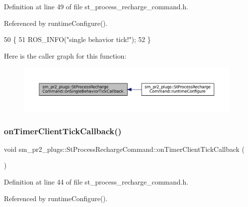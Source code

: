 Definition at line 49 of file st\+\_\+process\+\_\+recharge\+\_\+command.\+h.



Referenced by runtime\+Configure().


\begin{DoxyCode}
50     \{
51         ROS\_INFO(\textcolor{stringliteral}{"single behavior tick!"});
52     \}
\end{DoxyCode}
Here is the caller graph for this function\+:
\nopagebreak
\begin{figure}[H]
\begin{center}
\leavevmode
\includegraphics[width=350pt]{structsm__pr2__plugs_1_1StProcessRechargeCommand_acc2a9e8dbb67f236e16eafb4db51c3c5_icgraph}
\end{center}
\end{figure}
\mbox{\label{structsm__pr2__plugs_1_1StProcessRechargeCommand_a71c620cbe618019ad7338c9b88639c68}} 
\subsubsection{\texorpdfstring{on\+Timer\+Client\+Tick\+Callback()}{onTimerClientTickCallback()}}
{\footnotesize\ttfamily void sm\+\_\+pr2\+\_\+plugs\+::\+St\+Process\+Recharge\+Command\+::on\+Timer\+Client\+Tick\+Callback (\begin{DoxyParamCaption}{ }\end{DoxyParamCaption})\hspace{0.3cm}{\ttfamily [inline]}}



Definition at line 44 of file st\+\_\+process\+\_\+recharge\+\_\+command.\+h.



Referenced by runtime\+Configure().


